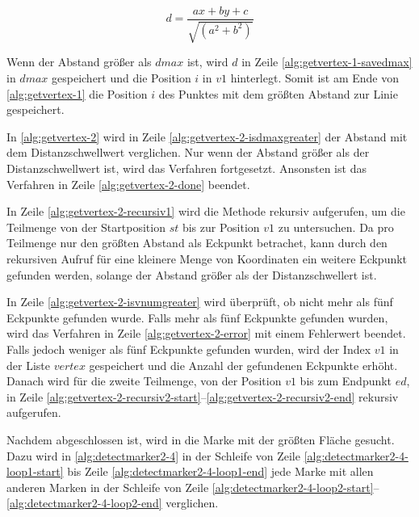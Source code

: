 \begin{equation}
	\label{eq:punktgeradenabstand}
	d = \frac{\mathit{ax} + \mathit{by} + c}{\sqrt{(a^2 + b^2)}}
\end{equation}

Wenn der Abstand größer als $\mathit{dmax}$ ist, wird $d$ in Zeile \ref{alg:getvertex-1-savedmax} in $\mathit{dmax}$
 gespeichert und die Position $i$ in $\mathit{v1}$ hinterlegt. Somit ist am Ende von \autoref{alg:getvertex-1} die
 Position $i$ des Punktes mit dem größten Abstand zur Linie gespeichert.

In \autoref{alg:getvertex-2} wird in Zeile \ref{alg:getvertex-2-isdmaxgreater} der Abstand mit dem Distanzschwellwert
 verglichen. Nur wenn der Abstand größer als der Distanzschwellwert ist, wird das Verfahren fortgesetzt. Ansonsten ist
 das Verfahren in Zeile \ref{alg:getvertex-2-done} beendet.



In Zeile \ref{alg:getvertex-2-recursiv1} wird die Methode  rekursiv aufgerufen, um die Teilmenge
 von der Startposition $\mathit{st}$ bis zur Position $\mathit{v1}$ zu untersuchen. Da  pro
 Teilmenge nur den größten Abstand als Eckpunkt betrachet, kann durch den rekursiven Aufruf für eine kleinere Menge von
 Koordinaten ein weitere Eckpunkt gefunden werden, solange der Abstand größer als der Distanzschwellert ist.

In Zeile \ref{alg:getvertex-2-isvnumgreater} wird überprüft, ob nicht mehr als fünf Eckpunkte gefunden wurde. Falls
 mehr als fünf Eckpunkte gefunden wurden, wird das Verfahren in Zeile \ref{alg:getvertex-2-error} mit einem Fehlerwert
 beendet. Falls jedoch weniger als fünf Eckpunkte gefunden wurden, wird der Index $\mathit{v1}$ in der Liste
 $\mathit{vertex}$ gespeichert und die Anzahl der gefundenen Eckpunkte erhöht. Danach wird  für die
 zweite Teilmenge, von der Position $\mathit{v1}$ bis zum Endpunkt $\mathit{ed}$, in Zeile
 \ref{alg:getvertex-2-recursiv2-start}--\ref{alg:getvertex-2-recursiv2-end} rekursiv aufgerufen.

Nachdem  abgeschlossen ist, wird in  die Marke mit der größten Fläche
 gesucht. Dazu wird in \autoref{alg:detectmarker2-4} in der Schleife von Zeile \ref{alg:detectmarker2-4-loop1-start}
 bis Zeile \ref{alg:detectmarker2-4-loop1-end} jede Marke mit allen anderen Marken in der Schleife von Zeile
 \ref{alg:detectmarker2-4-loop2-start}--\ref{alg:detectmarker2-4-loop2-end} verglichen.

